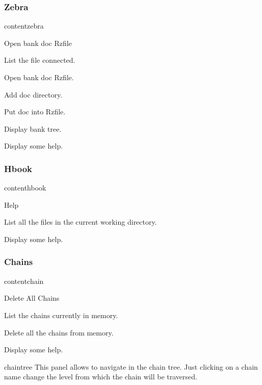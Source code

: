 \subsubsection{Zebra}

\begin{PAWf}[.55]{contentzebra}
\begin{DLsf}{Open bank doc Rzfile}
\item[List]                  List the \ZEBRA{} file connected.
\item[Open bank doc Rzfile]  Open bank doc Rzfile.
\item[Add doc directory]     Add doc directory.
\item[Put doc into Rzfile]   Put doc into Rzfile.
\item[Display bank tree]     Display bank tree.
\item[Help]                  Display some help.
\end{DLsf}
\end{PAWf}

\subsubsection{Hbook}
\begin{PAWf}[.55]{contenthbook}
\begin{DLsf}{Help}
\item[List]  List all the \HBOOK{} files in the current working directory.
\item[Help]  Display some help.
\end{DLsf}
\end{PAWf}

\subsubsection{Chains}

\begin{PAWf}[.55]{contentchain}
\begin{DLsf}{Delete All Chains}
\item[List]               List the chains currently in memory.
\item[Delete All Chains]  Delete all the chains from memory.
\item[Help]               Display some help.
\end{DLsf}
\end{PAWf}

\begin{PAWf}[.4]{chaintree}
This panel allows to navigate in the chain tree. Just clicking on a
chain name change the level from which the chain will be traversed.
\end{PAWf}


